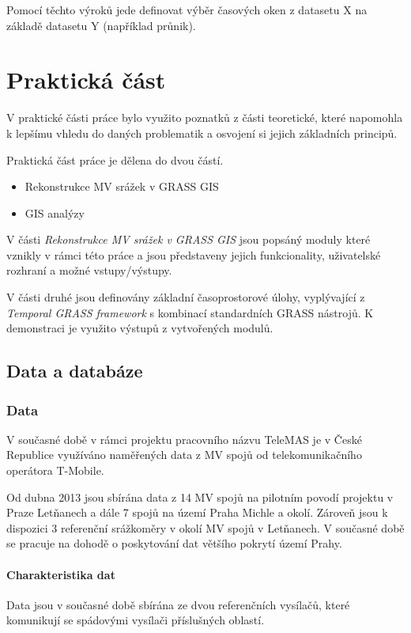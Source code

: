 \documentclass[a4paper,12pt,oneside]{report}
\begin{document}
Pomocí těchto výroků jede definovat výběr časových oken z datasetu X na základě datasetu Y (například průnik).



\newpage
\setcounter{footnote}{1}
\chapter*{Praktická část}

V praktické části práce bylo využito poznatků z části teoretické, které napomohla k lepšímu vhledu do daných problematik a osvojení si jejich základních principů. 

Praktická část práce je dělena do dvou částí.

\begin{itemize}
\item Rekonstrukce MV srážek v GRASS GIS
\item GIS analýzy
\end{itemize}


V části \textit{Rekonstrukce MV srážek v GRASS GIS} jsou popsáný moduly které vznikly v rámci této práce a jsou představeny jejich funkcionality, uživatelské rozhraní a  možné vstupy/výstupy.

V části druhé jsou definovány základní časoprostorové úlohy, vyplývající z \textit{Temporal GRASS framework} s kombinací standardních GRASS nástrojů. K demonstraci je využito výstupů z vytvořených modulů.

\setcounter{footnote}{1}
\section{Data a databáze}

\subsection{Data}  
V současné době v rámci projektu pracovního názvu TeleMAS  je v České Republice  využíváno naměřených data z MV spojů od telekomunikačního operátora T-Mobile. 

Od dubna 2013 jsou sbírána data z 14 MV spojů na pilotním povodí projektu v Praze Letňanech a dále 7 spojů na území Praha Michle a okolí. Zároveň jsou k dispozici 3 referenční srážkoměry v okolí MV spojů v Letňanech.
V současné době se pracuje na dohodě o poskytování dat většího pokrytí území Prahy.

\subsubsection*{ Charakteristika dat} Data jsou v současné době sbírána ze dvou referenčních vysílačů, které komunikují se spádovými vysílači příslušných oblastí. 
\end{document}
